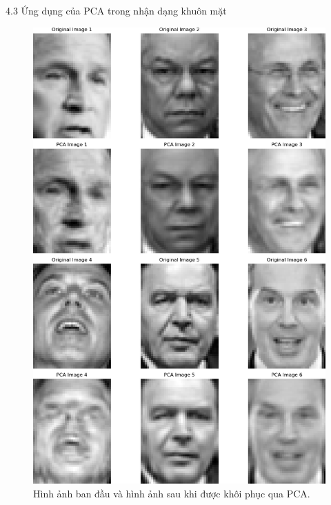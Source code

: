 \documentclass[notheorems,envcountsect,hyperref=unicode]{beamer}
\begin{document}
\begin{frame}{4.3 Ứng dụng của PCA trong nhận dạng khuôn mặt}
	\begin{figure}[htp]
		\centering
		\includegraphics[scale=0.2]{eigenface.png}
		\caption{Hình ảnh ban đầu và hình ảnh sau khi được khôi phục qua PCA.}
		\label{fig:eigenface}
	\end{figure}
\end{frame}
\end{document}

